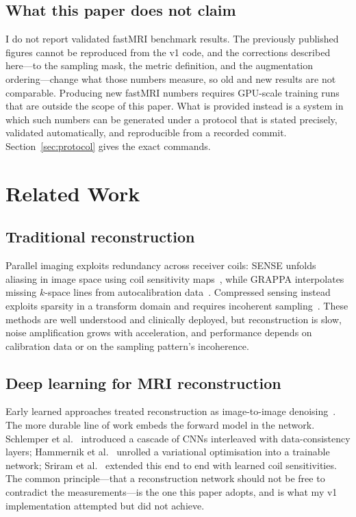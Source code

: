 \documentclass[11pt]{article}
\begin{document}
\subsection{What this paper does not claim}
\label{sec:not-claimed}

I do not report validated fastMRI benchmark results. The previously published
figures cannot be reproduced from the v1 code, and the corrections
described here---to the sampling mask, the metric definition, and the
augmentation ordering---change what those numbers measure, so old and new
results are not comparable. Producing new fastMRI numbers requires GPU-scale
training runs that are outside the scope of this paper. What is provided instead
is a system in which such numbers can be generated under a protocol that is
stated precisely, validated automatically, and reproducible from a recorded
commit. Section~\ref{sec:protocol} gives the exact commands.

\section{Related Work}

\subsection{Traditional reconstruction}

Parallel imaging exploits redundancy across receiver coils: SENSE unfolds
aliasing in image space using coil sensitivity maps~\cite{pruessmann1999}, while
GRAPPA interpolates missing $k$-space lines from autocalibration
data~\cite{griswold2002}. Compressed sensing instead exploits sparsity in a
transform domain and requires incoherent sampling~\cite{lustig2007}. These
methods are well understood and clinically deployed, but reconstruction is slow,
noise amplification grows with acceleration, and performance depends on
calibration data or on the sampling pattern's incoherence.

\subsection{Deep learning for MRI reconstruction}

Early learned approaches treated reconstruction as image-to-image
denoising~\cite{hyun2018, lee2018}. The more durable line of work embeds the
forward model in the network. Schlemper et al.~\cite{schlemper2018} introduced a
cascade of CNNs interleaved with data-consistency layers; Hammernik et
al.~\cite{hammernik2018} unrolled a variational optimisation into a trainable
network; Sriram et al.~\cite{sriram2020} extended this end to end with learned
coil sensitivities. The common principle---that a reconstruction network should
not be free to contradict the measurements---is the one this paper adopts, and
is what my v1 implementation attempted but did not achieve.
\end{document}
